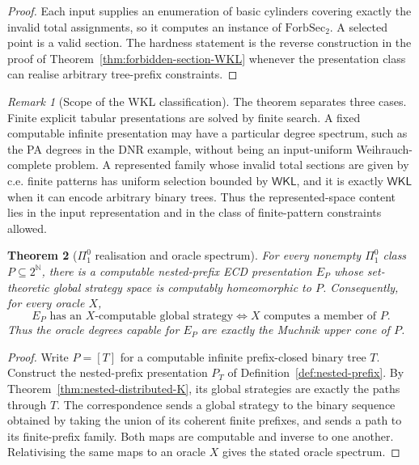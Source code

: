 \documentclass[11pt]{article}
\theoremstyle{plain}
\newtheorem{theorem}{Theorem}[section]
\theoremstyle{definition}
\theoremstyle{remark}
\newtheorem{remark}[theorem]{Remark}
\newcommand{\N}{\mathbb{N}}
\begin{document}
\begin{proof}
Each input supplies an enumeration of basic cylinders covering exactly the
invalid total assignments, so it computes an instance of
$\mathrm{ForbSec}_2$. A selected point is a valid section. The hardness statement
is the reverse construction in the proof of Theorem~\ref{thm:forbidden-section-WKL}
whenever the presentation class can realise arbitrary tree-prefix constraints.
\end{proof}

\begin{remark}[Scope of the WKL classification]
The theorem separates three cases. Finite explicit tabular presentations are
solved by finite search. A fixed computable infinite presentation may have a
particular degree spectrum, such as the PA degrees in the DNR example, without
being an input-uniform Weihrauch-complete problem. A represented family whose
invalid total sections are given by c.e. finite patterns has uniform selection
bounded by $\mathsf{WKL}$, and it is exactly $\mathsf{WKL}$ when it can encode
arbitrary binary trees. Thus the represented-space content lies in the input
representation and in the class of finite-pattern constraints allowed.
\end{remark}

\begin{theorem}[$\Pi^0_1$ realisation and oracle spectrum]
\label{thm:Pi01-realisation-spectrum}
For every nonempty $\Pi^0_1$ class $P\subseteq2^\N$, there is a computable
nested-prefix ECD presentation $E_P$ whose set-theoretic global strategy space is
computably homeomorphic to $P$. Consequently, for every oracle $X$,
\[
E_P\text{ has an }X\text{-computable global strategy}
\iff
X\text{ computes a member of }P.
\]
Thus the oracle degrees capable for $E_P$ are exactly the Muchnik upper cone of
$P$.
\end{theorem}

\begin{proof}
Write $P=[T]$ for a computable infinite prefix-closed binary tree $T$. Construct
the nested-prefix presentation $P_T$ of Definition~\ref{def:nested-prefix}. By
Theorem~\ref{thm:nested-distributed-K}, its global strategies are exactly the
paths through $T$. The correspondence sends a global strategy to the binary
sequence obtained by taking the union of its coherent finite prefixes, and sends
a path to its finite-prefix family. Both maps are computable and inverse to one
another. Relativising the same maps to an oracle $X$ gives the stated oracle
spectrum.
\end{proof}
\end{document}
